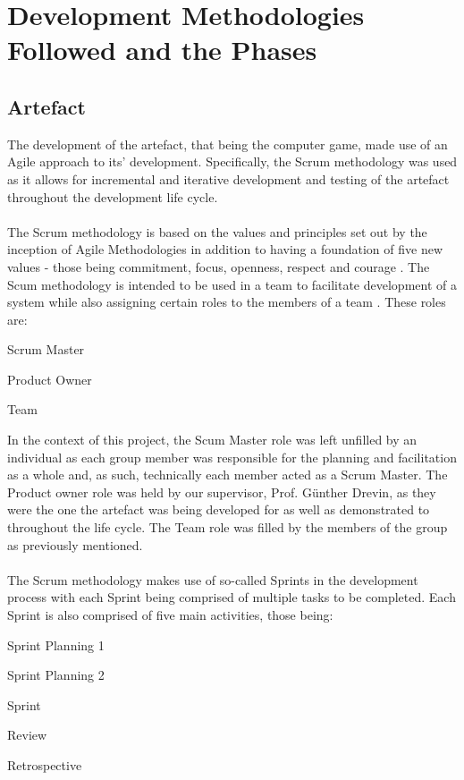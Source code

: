 \section{Development Methodologies Followed and the Phases}
\subsection{Artefact}
The development of the artefact, that being the computer game, made use of an Agile approach to its' development. Specifically, the Scrum methodology was used as it allows for incremental and iterative development and testing of the artefact throughout the development life cycle.
\\\\
The Scrum methodology is based on the values and principles set out by the inception of Agile Methodologies in addition to having a foundation of five new values - those being commitment, focus, openness, respect and courage \citep{scrumhermes}. The Scum methodology is intended to be used in a team to facilitate development of a system while also assigning certain roles to the members of a team \citep{scrumhermes}. These roles are:
\begin{itemize}
\begin{multicols}{3}
\item Scrum Master
\item Product Owner
\item Team
\end{multicols}
\end{itemize}
\noindent In the context of this project, the Scum Master role was left unfilled by an individual as
each group member was responsible for the planning and facilitation as a whole and, as such, technically each member acted as a Scrum Master. The Product owner role was held by our supervisor, Prof. Günther Drevin, as they were the one the artefact was being developed for as well as demonstrated to throughout the life cycle. The Team role was filled by the members of the group as previously mentioned.
\\\\
The Scrum methodology makes use of so-called Sprints in the development process with each Sprint being comprised of multiple tasks to be completed. Each Sprint is also comprised of five main activities, those being:
\begin{enumerate}
\begin{multicols}{2}
\item Sprint Planning 1
\item Sprint Planning 2
\item Sprint
\columnbreak
\raggedcolumns
\item Review
\item Retrospective
\end{multicols}
\end{enumerate}

